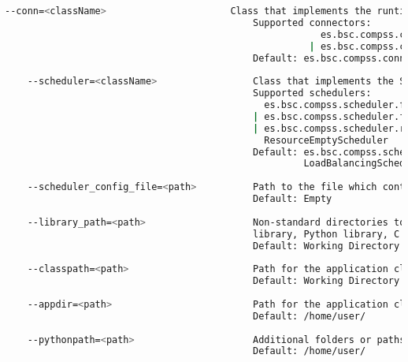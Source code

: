 \begin{lstlisting}[language=bash]
    --conn=<className>                      Class that implements the runtime connector for the cloud
                                            Supported connectors: 
                                                        es.bsc.compss.connectors.DefaultSSHConnector
                                                      | es.bsc.compss.connectors.DefaultNoSSHConnector
                                            Default: es.bsc.compss.connectors.DefaultSSHConnector
                                            
    --scheduler=<className>                 Class that implements the Scheduler for COMPSs
                                            Supported schedulers: 
                                              es.bsc.compss.scheduler.fullGraphScheduler.FullGraphScheduler
                                            | es.bsc.compss.scheduler.fifoScheduler.FIFOScheduler
                                            | es.bsc.compss.scheduler.resourceEmptyScheduler.
                                              ResourceEmptyScheduler
                                            Default: es.bsc.compss.scheduler.loadBalancingScheduler.
                                                     LoadBalancingScheduler
                                            
    --scheduler_config_file=<path>          Path to the file which contains the scheduler configuration.
                                            Default: Empty
                                            
    --library_path=<path>                   Non-standard directories to search for libraries (e.g. Java JVM
                                            library, Python library, C binding library)
                                            Default: Working Directory
                                            
    --classpath=<path>                      Path for the application classes / modules
                                            Default: Working Directory
                                            
    --appdir=<path>                         Path for the application class folder.
                                            Default: /home/user/
                                            
    --pythonpath=<path>                     Additional folders or paths to add to the PYTHONPATH
                                            Default: /home/user/
                                            

\end{lstlisting}
